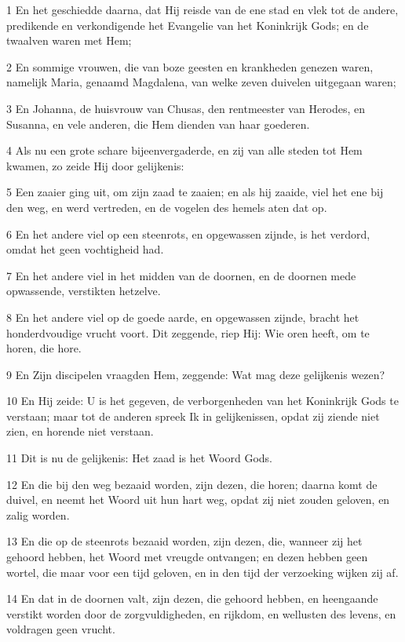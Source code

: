 \par 1 En het geschiedde daarna, dat Hij reisde van de ene stad en vlek tot de andere, predikende en verkondigende het Evangelie van het Koninkrijk Gods; en de twaalven waren met Hem;
\par 2 En sommige vrouwen, die van boze geesten en krankheden genezen waren, namelijk Maria, genaamd Magdalena, van welke zeven duivelen uitgegaan waren;
\par 3 En Johanna, de huisvrouw van Chusas, den rentmeester van Herodes, en Susanna, en vele anderen, die Hem dienden van haar goederen.
\par 4 Als nu een grote schare bijeenvergaderde, en zij van alle steden tot Hem kwamen, zo zeide Hij door gelijkenis:
\par 5 Een zaaier ging uit, om zijn zaad te zaaien; en als hij zaaide, viel het ene bij den weg, en werd vertreden, en de vogelen des hemels aten dat op.
\par 6 En het andere viel op een steenrots, en opgewassen zijnde, is het verdord, omdat het geen vochtigheid had.
\par 7 En het andere viel in het midden van de doornen, en de doornen mede opwassende, verstikten hetzelve.
\par 8 En het andere viel op de goede aarde, en opgewassen zijnde, bracht het honderdvoudige vrucht voort. Dit zeggende, riep Hij: Wie oren heeft, om te horen, die hore.
\par 9 En Zijn discipelen vraagden Hem, zeggende: Wat mag deze gelijkenis wezen?
\par 10 En Hij zeide: U is het gegeven, de verborgenheden van het Koninkrijk Gods te verstaan; maar tot de anderen spreek Ik in gelijkenissen, opdat zij ziende niet zien, en horende niet verstaan.
\par 11 Dit is nu de gelijkenis: Het zaad is het Woord Gods.
\par 12 En die bij den weg bezaaid worden, zijn dezen, die horen; daarna komt de duivel, en neemt het Woord uit hun hart weg, opdat zij niet zouden geloven, en zalig worden.
\par 13 En die op de steenrots bezaaid worden, zijn dezen, die, wanneer zij het gehoord hebben, het Woord met vreugde ontvangen; en dezen hebben geen wortel, die maar voor een tijd geloven, en in den tijd der verzoeking wijken zij af.
\par 14 En dat in de doornen valt, zijn dezen, die gehoord hebben, en heengaande verstikt worden door de zorgvuldigheden, en rijkdom, en wellusten des levens, en voldragen geen vrucht.
